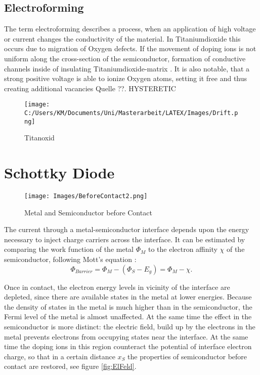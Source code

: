 \documentclass[12pt]{article}
\begin{document}

\subsection{Electroforming}
	The term electroforming describes a process, when an application of high voltage or current changes the conductivity of the material\cite{Effect}. In Titaniumdioxide this occurs due to migration of Oxygen defects. If the movement of doping ions is not uniform along the cross-section of the semiconductor, formation of conductive channels inside of insulating Titaniumdioxide-matrix \cite{Effect}. It is also notable, that a strong positive voltage is able to ionize Oxygen atoms, setting it free and thus creating additional vacancies \cite{Effect, }Quelle ??.
	HYSTERETIC
	
	\begin{figure}[htb]
		\centering
			\texttt{[image: C:/Users/KM/Documents/Uni/Masterarbeit/LATEX/Images/Drift.png]}
		\caption{Titanoxid}
		\label{fig:Drift}
	\end{figure}
	
\section{Schottky Diode}

\begin{figure}[htb]
	\centering
		\texttt{[image: Images/BeforeContact2.png]}
	\caption{Metal and Semiconductor before Contact}
	\label{fig:BeforeContact}
\end{figure}

	The current through a metal-semiconductor interface depends upon the energy necessary to inject charge carriers across the interface.
It can be estimated by comparing the work function of the metal $\Phi _M$ to the electron affinity $\chi$ of the semiconductor, following Mott's equation \cite{Fundamentals}:
\begin{equation}
	\Phi _{Barrier} = \Phi _M - (\Phi _S - E_g) = \Phi _M - \chi.
\end{equation}

Once in contact, the electron energy levels in vicinity of the interface are depleted, since there are available states in the metal at lower energies. Because the density of states in the metal is much higher than in the semiconductor, the Fermi level of the metal is almost unaffected. At the same time the effect in the semiconductor is more distinct: the electric field, build up by the electrons in the metal prevents electrons from occupying states near the interface. At the same time the doping ions in this region counteract the potential of interface electron charge, so that in a certain distance $x_S$ the properties of semiconductor before contact are restored, see figure \ref{fig:ElFeld}. 
\end{document}
